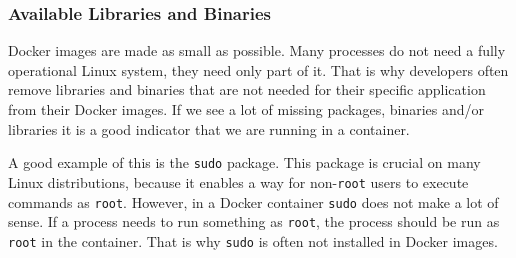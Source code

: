 \subsubsection{Available Libraries and Binaries}
Docker images are made as small as possible. Many processes do not need a fully operational Linux system, they need only part of it. That is why developers often remove libraries and binaries that are not needed for their specific application from their Docker images. If we see a lot of missing packages, binaries and/or libraries it is a good indicator that we are running in a container.

\hfill

A good example of this is the \lstinline{sudo} package. This package is crucial on many Linux distributions, because it enables a way for non-\lstinline{root} users to execute commands as \lstinline{root}. However, in a Docker container \lstinline{sudo} does not make a lot of sense. If a process needs to run something as \lstinline{root}, the process should be run as \lstinline{root} in the container. That is why \lstinline{sudo} is often not installed in Docker images.
